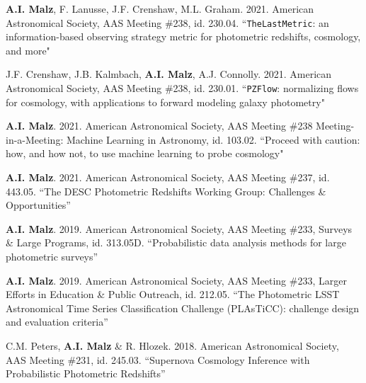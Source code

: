{}
\nopagebreak\begin{list}{}{\malzlist}
	
	\item {\bf A.I. Malz}, F. Lanusse, J.F. Crenshaw, M.L. Graham. 2021. American Astronomical Society, AAS Meeting \#238, id. 230.04. ``\texttt{TheLastMetric}: an information-based observing strategy metric for photometric redshifts, cosmology, and more" 
	
	\item J.F. Crenshaw, J.B. Kalmbach, {\bf A.I. Malz}, A.J. Connolly. 2021. American Astronomical Society, AAS Meeting \#238, id. 230.01. ``\texttt{PZFlow}: normalizing flows for cosmology, with applications to forward modeling galaxy photometry" 
	
	\item {\bf A.I. Malz}. 2021. American Astronomical Society, AAS Meeting \#238 Meeting-in-a-Meeting: Machine Learning in Astronomy, id. 103.02. ``Proceed with caution: how, and how not, to use machine learning to probe cosmology" 
	
	\item {\bf A.I. Malz}. 2021. American Astronomical Society, AAS Meeting \#237, id. 443.05. ``The DESC Photometric Redshifts Working Group: Challenges \& Opportunities'' 
	
	\item {\bf A.I. Malz}. 2019. American Astronomical Society, AAS Meeting \#233, Surveys \& Large Programs, id. 313.05D. ``Probabilistic data analysis methods for large photometric surveys'' 
	\item {\bf A.I. Malz}. 2019. American Astronomical Society, AAS Meeting \#233, Larger Efforts in Education \& Public Outreach, id. 212.05. ``The Photometric LSST Astronomical Time Series Classification Challenge (PLAsTiCC): challenge design and evaluation criteria” 
	
	\item C.M. Peters, {\bf A.I. Malz} \& R. Hlozek. 2018. American Astronomical Society, AAS Meeting \#231, id. 245.03. ``Supernova Cosmology Inference with Probabilistic Photometric Redshifts'' 
	

\end{list}
